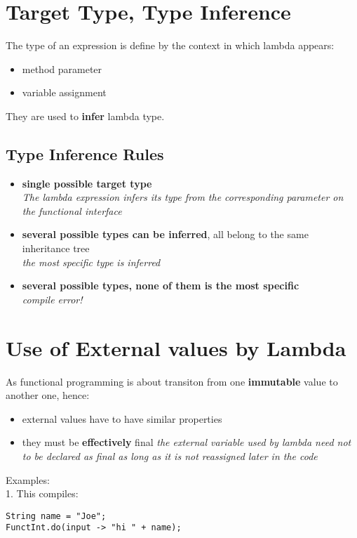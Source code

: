 \documentclass{report}
\begin{document}
\section{Target Type, Type Inference}

The type of an expression is define by the context in which lambda appears:
\begin{itemize}
	\item method parameter
	\item variable assignment
\end{itemize}
They are used to \textbf{infer} lambda type.

\subsection*{Type Inference Rules}
\begin{itemize}
	\item \textbf{single possible target type}\\
	\textit{	The lambda expression infers its type from the corresponding parameter on the functional interface}
	\item \textbf{several possible types can be inferred}, all belong to the same inheritance tree\\
	\textit{	the most specific type is inferred}
	\item \textbf{several possible types, none of them is the most specific}\\
	\textit{compile error!}
	
\end{itemize}

\section{Use of External values by Lambda}

As functional programming is about transiton from one \textbf{immutable} value to another one, hence:
\begin{itemize}
	\item external values have to have similar properties
	\item they must be \textbf{effectively} final
	\textit{the external variable used by lambda need not to be declared as final as long as it is not \textit{reassigned} later in the code }
	
\end{itemize}
Examples:\\
1. This compiles:
\begin{verbatim}
String name = "Joe";
FunctInt.do(input -> "hi " + name);
\end{verbatim}
\end{document}
